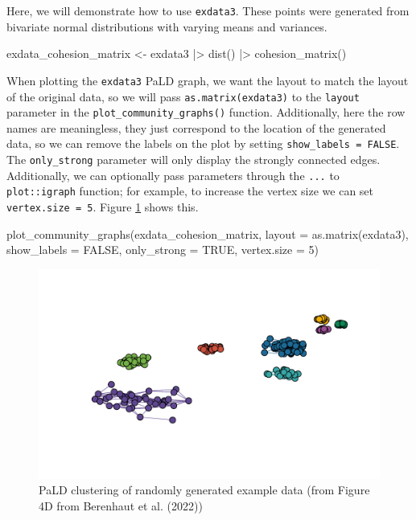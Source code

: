 Here, we will demonstrate how to use \texttt{exdata3}. These points were
generated from bivariate normal distributions with varying means and
variances.

\begin{Schunk}
\begin{Sinput}
exdata_cohesion_matrix <- exdata3 |>
  dist() |>
  cohesion_matrix()
\end{Sinput}
\end{Schunk}

When plotting the \texttt{exdata3} PaLD graph, we want the layout to
match the layout of the original data, so we will pass
\texttt{as.matrix(exdata3)} to the \texttt{layout} parameter in the
\texttt{plot\_community\_graphs()} function. Additionally, here the row
names are meaningless, they just correspond to the location of the
generated data, so we can remove the labels on the plot by setting
\texttt{show\_labels\ =\ FALSE}. The \texttt{only\_strong} parameter
will only display the strongly connected edges. Additionally, we can
optionally pass parameters through the \texttt{...} to
\texttt{plot::igraph} function; for example, to increase the vertex size
we can set \texttt{vertex.size\ =\ 5}. Figure \ref{fig:fig6} shows this.

\begin{Schunk}
\begin{Sinput}
plot_community_graphs(exdata_cohesion_matrix,
                layout = as.matrix(exdata3),
                show_labels = FALSE, 
                only_strong = TRUE,
                vertex.size = 5)
\end{Sinput}
\begin{figure}
\includegraphics{manuscript_files/figure-latex/fig6-1} \caption[PaLD clustering of randomly generated example data (from Figure 4D from Berenhaut et al]{PaLD clustering of randomly generated example data (from Figure 4D from Berenhaut et al. (2022))}\label{fig:fig6}
\end{figure}
\end{Schunk}

